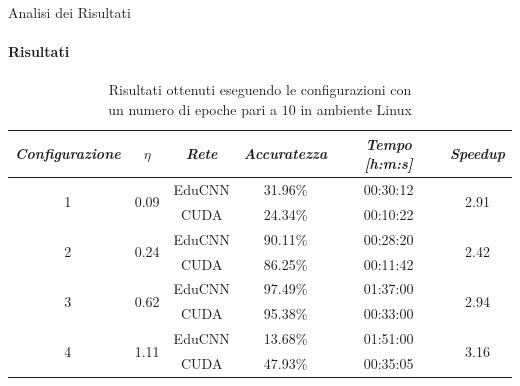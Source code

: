 \documentclass[
 ]{beamer}
\begin{document}
\begin{frame}{Analisi dei Risultati}
    \framesubtitle{Risultati}

        \begin{table}
            \centering
            \renewcommand\arraystretch{1.3}
            \small
            \begin{tabular}{| c | c | c | c | c | c |}
                \hline
                \emph{Configurazione} & $\eta$ & \emph{Rete} & \emph{Accuratezza} & \emph{Tempo [h:m:s]} & \emph{Speedup} \\
                \hline
                \multirow{2}{*}{1} & \multirow{2}{*}{0.09} & EduCNN & 31.96\% & 00:30:12 & \multirow{2}{*}{2.91} \\ \cline{3-5} 
                                   &                       & CUDA   & 24.34\% & 00:10:22 & \\
                \hline
                \multirow{2}{*}{2} & \multirow{2}{*}{0.24} & EduCNN & 90.11\% & 00:28:20 & \multirow{2}{*}{2.42} \\ \cline{3-5} 
                                   &                       & CUDA   & 86.25\% & 00:11:42 & \\
                \hline
                \multirow{2}{*}{3} & \multirow{2}{*}{0.62} & EduCNN & 97.49\% & 01:37:00 & \multirow{2}{*}{2.94} \\ \cline{3-5} 
                                   &                       & CUDA   & 95.38\% & 00:33:00 & \\
                \hline
                \multirow{2}{*}{4} & \multirow{2}{*}{1.11} & EduCNN & 13.68\% & 01:51:00 & \multirow{2}{*}{3.16} \\ \cline{3-5} 
                                   &                       & CUDA   & 47.93\% & 00:35:05 & \\
                \hline
            \end{tabular}
            \caption            
    {Risultati ottenuti eseguendo le configurazioni con \\ un numero di epoche pari a $10$ in ambiente Linux\endtabular}          
        \end{table}    
\end{frame}
\end{document}
